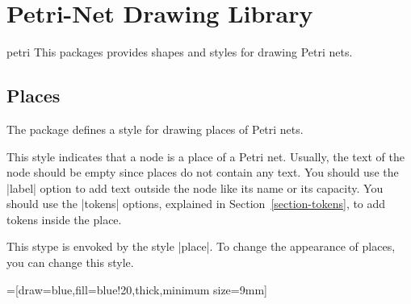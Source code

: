 %
%
%


\section{Petri-Net Drawing Library}

\begin{tikzlibrary}{petri}
  This packages provides shapes and styles for drawing Petri nets. 
\end{tikzlibrary}



\subsection{Places}

The package defines a style for drawing places of Petri nets. 

\begin{itemize}
  This style indicates that a node is a place of a Petri net. Usually,
  the text of the node should be empty since places do not contain any
  text. You should use the |label| option to add text outside the node
  like its name or its capacity. You should use the |tokens| options,
  explained in Section~\ref{section-tokens}, to add tokens inside the
  place.
  
\begin{codeexample}[]
\end{codeexample}
  
  This stype is envoked by the style |place|. To change the
  appearance of places, you can change this style.
\begin{codeexample}[]
=[draw=blue,fill=blue!20,thick,minimum size=9mm]
\end{codeexample}
\end{itemize}



